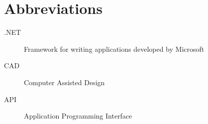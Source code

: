 \chapter{Abbreviations}
\label{ch:abbreviations}

\begin{description}
    \item[.NET] Framework for writing applications developed by Microsoft
    \item[CAD] Computer Assisted Design
    \item[API] Application Programming Interface
\end{description}